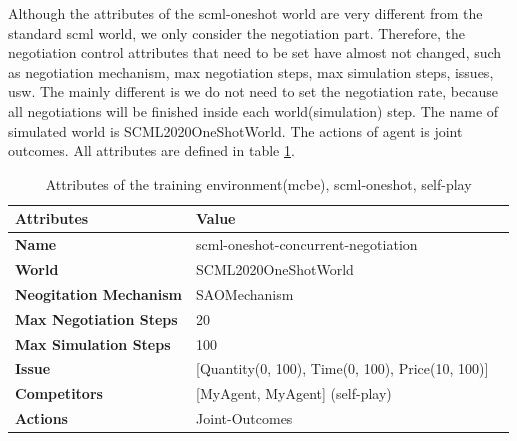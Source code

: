 Although the attributes of the scml-oneshot world are very different from the standard scml world, we only consider the negotiation part. Therefore, the negotiation control attributes that need to be set have almost not changed, such as negotiation mechanism, max negotiation steps, max simulation steps, issues, usw.
The mainly different is we do not need to set the negotiation rate, because all negotiations will be finished inside each world(simulation) step. The name of simulated world is SCML2020OneShotWorld. The actions of agent is joint outcomes. All attributes are defined in table \ref{tab:attributes-mcbe-concurrent-negotiation-scml-oneshot}.

\begin{table}[htbp]
\centering
\begin{tabular}{l l l} \toprule
\bfseries \textbf{Attributes}    & \bfseries \textbf{Value}                                             \\ \midrule
\textbf{Name}                    & scml-oneshot-concurrent-negotiation                                  \\
\textbf{World}                   & SCML2020OneShotWorld                                                 \\
\textbf{Neogitation Mechanism}   & SAOMechanism                                                         \\
\textbf{Max Negotiation Steps}   & 20                                                                  \\
\textbf{Max Simulation Steps}    & 100                                                                   \\
\textbf{Issue}             	     & [Quantity(0, 100), Time(0, 100), Price(10, 100)]                     \\
\textbf{Competitors}             & [MyAgent, MyAgent] (self-play)                                       \\
\textbf{Actions}                 & Joint-Outcomes                                                             \\
\bottomrule
\end{tabular}
\caption{Attributes of the training environment(mcbe), scml-oneshot, self-play}
\label{tab:attributes-mcbe-concurrent-negotiation-scml-oneshot}
\end{table}

